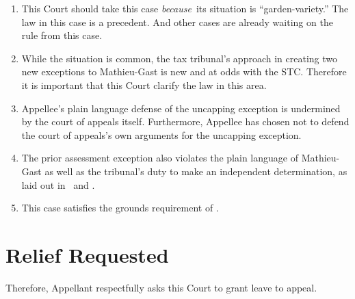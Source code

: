 \documentclass[12pt,\documentclassflag]{michiganCourtOfAppealsBrief}
\begin{document}
\begin{enumerate}
\item This Court should take this case \emph{because}\ its situation is ``garden-variety.'' The law in this case is a precedent. And other cases are already waiting on the rule from this case.
  
\item While the situation is common, the tax tribunal's approach in creating two new exceptions to Mathieu-Gast is new and at odds with the STC. Therefore it is important that this Court clarify the law in this area.

\item Appellee's plain language defense of the uncapping exception is undermined by the court of appeals itself. Furthermore, Appellee has chosen not to defend the court of appeals's own arguments for the uncapping exception.

\item The prior assessment exception also violates the plain language of Mathieu-Gast as well as the tribunal's duty to make an independent determination, as laid out in \cite{Jones & Laughlin}\ and \cite{Great Lakes Div of Nat'l Steel Corp}. 

\item This case satisfies the grounds requirement of \cite{MCR 7.305(B)}.
\end{enumerate}

\section{Relief Requested}

Therefore, Appellant respectfully asks this Court to grant leave to appeal.



\vspace{1\baselineskip}
\end{document}

